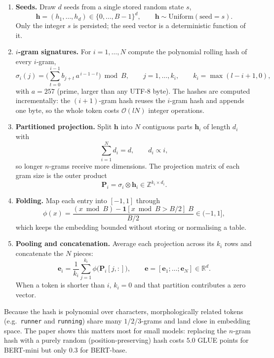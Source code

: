 \begin{enumerate}
\item \textbf{Seeds.} Draw $d$ seeds from a single stored random state $s$,
\[
\mathbf{h} = (h_1,\dots,h_d) \in \{0,\dots,B-1\}^d,
\qquad \mathbf{h} \sim \mathrm{Uniform}(\text{seed}=s).
\]
Only the integer $s$ is persisted; the seed vector is a deterministic function of it.

\item \textbf{$i$-gram signatures.} For $i=1,\dots,N$ compute the polynomial rolling hash of every $i$-gram,
\[
\sigma_i(j) = \Big(\sum_{t=0}^{i-1} b_{j+t}\,a^{\,i-1-t}\Big) \bmod B,
\qquad j=1,\dots,k_i,
\qquad k_i=\max(l-i+1,0),
\]
with $a=257$ (prime, larger than any UTF-8 byte). The hashes are computed incrementally: the $(i{+}1)$-gram hash reuses the $i$-gram hash and appends one byte, so the whole token costs $\mathcal{O}(lN)$ integer operations.

\item \textbf{Partitioned projection.} Split $\mathbf{h}$ into $N$ contiguous parts $\mathbf{h}_i$ of length $d_i$ with
\[
\sum_{i=1}^{N} d_i = d, \qquad d_i \propto i,
\]
so longer $n$-grams receive more dimensions. The projection matrix of each gram size is the outer product
\[
\mathbf{P}_i = \sigma_i \otimes \mathbf{h}_i \in \mathbb{Z}^{k_i\times d_i}.
\]

\item \textbf{Folding.} Map each entry into $[-1,1]$ through
\[
\phi(x) = \frac{(x \bmod B) - \mathbf{1}[x \bmod B > B/2]\;B}{B/2} \in (-1, 1],
\]
which keeps the embedding bounded without storing or normalising a table.

\item \textbf{Pooling and concatenation.} Average each projection across its $k_i$ rows and concatenate the $N$ pieces:
\[
\mathbf{e}_i = \frac{1}{k_i}\sum_{j=1}^{k_i} \phi\big(\mathbf{P}_i[j,:]\big),
\qquad
\mathbf{e} = [\mathbf{e}_1;\dots;\mathbf{e}_N] \in \mathbb{R}^{d}.
\]
When a token is shorter than $i$, $k_i=0$ and that partition contributes a zero vector.
\end{enumerate}

Because the hash is polynomial over characters, morphologically related tokens (e.g.\ \texttt{runner} and \texttt{running}) share many $1$/$2$/$3$-grams and land close in embedding space. The paper shows this matters most for small models: replacing the $n$-gram hash with a purely random (position-preserving) hash costs $5.0$ GLUE points for BERT-mini but only $0.3$ for BERT-base.

